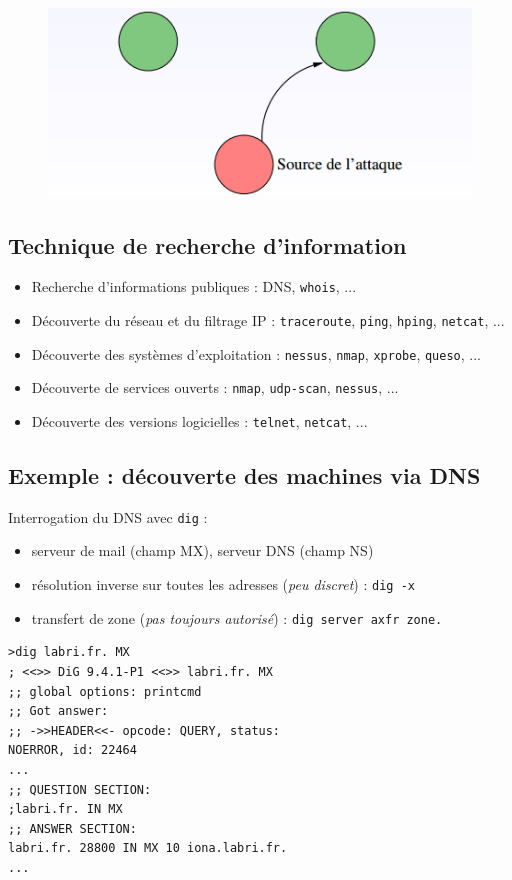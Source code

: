 \documentclass[journal, a4paper]{IEEEtran}
\begin{document}
		\begin{figure}[!hbt]
			\begin{center}
				\includegraphics[width=\columnwidth]{img/but_fab.png}
				\label{fig:but_fab}
			\end{center}
		\end{figure}
		
	\subsection{Technique de recherche d'information}
		\begin{itemize}
			\item Recherche d'informations publiques : DNS, \verb|whois|, ...
			\item Découverte du réseau et du filtrage IP : \verb|traceroute|, \verb|ping|, \verb|hping|, \verb|netcat|, ...
			\item Découverte des systèmes d'exploitation : \verb|nessus|, \verb|nmap|, \verb|xprobe|, \verb|queso|, ...
			\item Découverte de services ouverts : \verb|nmap|, \verb|udp-scan|, \verb|nessus|, ...
			\item Découverte des versions logicielles : \verb|telnet|, \verb|netcat|, ...
		\end{itemize}
		
	\subsection{Exemple : découverte des machines via DNS}
		Interrogation du DNS avec \verb$dig$ :
		\begin{itemize}
			\item serveur de mail (champ MX), serveur DNS (champ NS)
			\item résolution inverse sur toutes les adresses (\textsl{peu discret}) : \verb$dig -x$
			\item transfert de zone (\textsl{pas toujours autorisé}) : \verb$dig server axfr zone.$
		\end{itemize}
		\begin{Verbatim}[fontsize=\small]
>dig labri.fr. MX
; <<>> DiG 9.4.1-P1 <<>> labri.fr. MX
;; global options: printcmd
;; Got answer:
;; ->>HEADER<<- opcode: QUERY, status:
NOERROR, id: 22464
...
;; QUESTION SECTION:
;labri.fr. IN MX
;; ANSWER SECTION:
labri.fr. 28800 IN MX 10 iona.labri.fr.
...
		\end{Verbatim}
		
\end{document}
